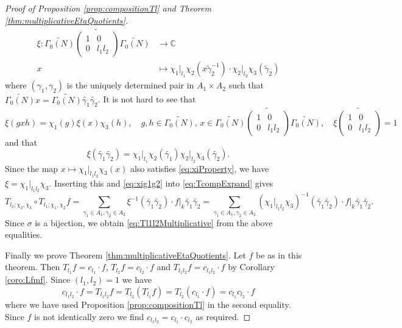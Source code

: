 \documentclass[12pt]{amsart}
\numberwithin{equation}{section}
\theoremstyle{plain}
\theoremstyle{definition}
\theoremstyle{remark}
\newcommand\tbtmat[4]{\left(\begin{smallmatrix}{#1} & {#2} \\ {#3} & {#4}\end{smallmatrix}\right)}
\newcommand\numC{\mathbb{C}}
\begin{document}
\begin{proof}[Proof of Proposition \ref{prop:compositionTl} and Theorem \ref{thm:multiplicativeEtaQuotients}]
\begin{align*}
\xi\colon\widetilde{\Gamma_0(N)}\widetilde{\tbtmat{1}{0}{0}{l_1l_2}}\widetilde{\Gamma_0(N)}&\rightarrow\numC\\
x&\mapsto\chi_1\vert_{l_1}\chi_2(x\widetilde\gamma_2^{-1})\cdot\chi_2\vert_{l_2}\chi_3(\widetilde\gamma_2)
\end{align*}
where $(\gamma_1,\gamma_2)$ is the uniquely determined pair in $A_1\times A_2$ such that $\widetilde{\Gamma_0(N)}x=\widetilde{\Gamma_0(N)}\widetilde{\gamma_1}\widetilde{\gamma_2}$. It is not hard to see that
\begin{equation}
\label{eq:xiProperty}
\xi(gxh)=\chi_1(g)\xi(x)\chi_3(h),\quad g,h\in\widetilde{\Gamma_0(N)},\,x\in\widetilde{\Gamma_0(N)}\widetilde{\tbtmat{1}{0}{0}{l_1l_2}}\widetilde{\Gamma_0(N)},\quad\xi\widetilde{\tbtmat{1}{0}{0}{l_1l_2}}=1
\end{equation}
and that
\begin{equation}
\label{eq:xig1g2}
\xi(\widetilde{\gamma_1}\widetilde{\gamma_2})=\chi_1\vert_{l_1}\chi_2(\widetilde{\gamma_1})\chi_2\vert_{l_2}\chi_3(\widetilde{\gamma_2}).
\end{equation}
Since the map $x\mapsto\chi_1\vert_{l_1l_2}\chi_3(x)$ also satisfies \eqref{eq:xiProperty}, we have $\xi=\chi_1\vert_{l_1l_2}\chi_3$. Inserting this and \eqref{eq:xig1g2} into \eqref{eq:TcompExpand} gives
\begin{equation*}
T_{l_2;\chi_2,\chi_3}\circ T_{l_1;\chi_1,\chi_2}f=\sum_{\gamma_1\in A_1,\gamma_2\in A_2}\xi^{-1}(\widetilde{\gamma_1}\widetilde{\gamma_2})\cdot f\vert_k\widetilde{\gamma_1}\widetilde{\gamma_2}=\sum_{\gamma_1\in A_1,\gamma_2\in A_2}(\chi_1\vert_{l_1l_2}\chi_3)^{-1}(\widetilde{\gamma_1}\widetilde{\gamma_2})\cdot f\vert_k\widetilde{\gamma_1}\widetilde{\gamma_2}.
\end{equation*}
Since $\sigma$ is a bijection, we obtain \eqref{eq:Tl1l2Multiplicative} from the above equalities.

Finally we prove Theorem \ref{thm:multiplicativeEtaQuotients}. Let $f$ be as in this theorem. Then $T_{l_1}f=c_{l_1}\cdot f$, $T_{l_2}f=c_{l_2}\cdot f$ and $T_{l_1l_2}f=c_{l_1l_2}\cdot f$ by Corollary \ref{coro:Lfmf}. Since $(l_1,l_2)=1$ we have
\begin{equation*}
c_{l_1l_2}\cdot f=T_{l_1l_2}f=T_{l_2}(T_{l_1}f)=T_{l_2}(c_{l_1}\cdot f)=c_{l_1}c_{l_2}\cdot f
\end{equation*}
where we have used Proposition \ref{prop:compositionTl} in the second equality. Since $f$ is not identically zero we find $c_{l_1l_2}=c_{l_1}\cdot c_{l_2}$ as required.
\end{proof}
\end{document}
